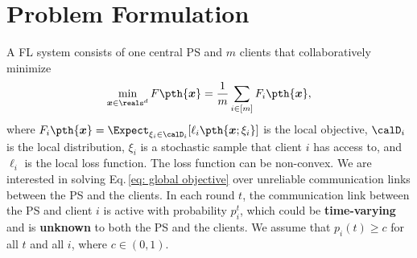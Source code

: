 \documentclass[letterpaper, 10 pt, conference]{ieeeconf}  %
\newcommand{\x}{{\bm x}}
\begin{document}
\section{Problem Formulation}
A FL system consists of %
one central PS and $m$ clients %
that collaboratively  minimize
\begin{align}
\min\limits_{\x\in\reals^d}F\pth{\x} = \frac{1}{m} \sum_{i\in[m]} F_i \pth{\x}, 
\label{eq: global objective}
\end{align}
where
$F_i\pth{\x} = \Expect_{\xi_i\in \calD_i}[\ell_i \pth{\x;\xi_i}]$ is the local objective, 
$\calD_i$ is the local distribution, %
$\xi_i$ is a stochastic sample that client $i$ has access to,
and $\ell_i$ is the local loss function.
The loss function can be non-convex. 
We are interested in solving Eq.\,\eqref{eq: global objective} over unreliable communication links between the PS and the clients. 
In each round $t$, the communication link between the PS and client $i$ is active with probability $p_i^t$, which could be {\bf time-varying} and is {\bf unknown} to both the PS and the clients.  
We assume that $p_i(t)\ge c$ for all $t$ and all $i$, where $c\in (0,1)$. 
\end{document}
